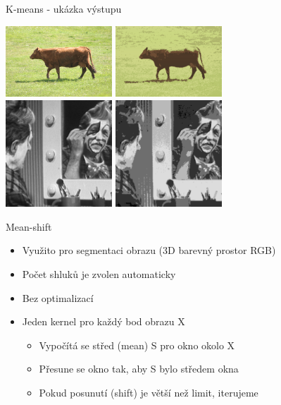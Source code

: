 \documentclass{beamer}
\begin{document}
\begin{frame}{K-means - ukázka výstupu}
  \begin{center}
    \includegraphics[width=4cm,keepaspectratio]{images/img.pdf}
    \quad
    \includegraphics[width=4cm,keepaspectratio]{images/km.pdf}\\ \medskip
    \includegraphics[width=4cm,keepaspectratio]{images/sobel.pdf}
    \quad
    \includegraphics[width=4cm,keepaspectratio]{images/sobel_km.pdf}
  \end{center}
\end{frame}


\begin{frame}{Mean-shift}
  \begin{itemize}
    \item Využito pro segmentaci obrazu (3D barevný prostor RGB)
    \item Počet shluků je zvolen automaticky
    \item Bez optimalizací
    \medskip
    \item Jeden kernel pro každý bod obrazu X
    \medskip
      \begin{itemize}
        \item Vypočítá se střed (mean) S pro okno okolo X
        \item Přesune se okno tak, aby S bylo středem okna
        \item Pokud posunutí (shift) je větší než limit, iterujeme
      \end{itemize}
    \medskip
  \end{itemize}
\end{frame}
\end{document}
